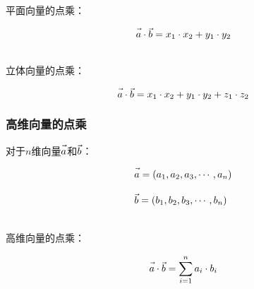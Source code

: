 \documentclass[UTF8]{ctexart}
\let\nvec\vec
\def\vec#1{\nvec{\vphantom b\smash{#1}}}
\begin{document}
\newpage

    平面向量的点乘：
    \begin{large}
        \begin{equation*}
            \vec{a}\cdot\vec{b}=x_1\cdot x_2+y_1\cdot y_2
        \end{equation*}
    \end{large}\\
    立体向量的点乘：
    \begin{large}
        \begin{equation*}
            \vec{a}\cdot\vec{b}=x_1\cdot x_2+y_1\cdot y_2+z_1\cdot z_2
        \end{equation*}
    \end{large}\vspace{-10pt}

\subsubsection{高维向量的点乘}
    对于$n$维向量$\vec{a}$和$\vec{b}$：
    \begin{large}
        \begin{align*}
            &\vec{a}=\left(a_1,a_2,a_3,\cdots,a_n\right)\\[3mm]
            &\vec{b}=\left(b_1,b_2,b_3,\cdots,b_n\right)
        \end{align*}
    \end{large}\\
    高维向量的点乘：
    \begin{large}
        \begin{equation*}
            \vec{a}\cdot\vec{b}=\sum^n_{i=1}a_i\cdot b_i
        \end{equation*}
    \end{large}\vspace{10pt}
\end{document}
